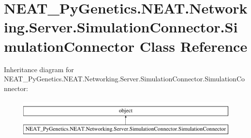 \hypertarget{classNEAT__PyGenetics_1_1NEAT_1_1Networking_1_1Server_1_1SimulationConnector_1_1SimulationConnector}{}\section{N\+E\+A\+T\+\_\+\+Py\+Genetics.\+N\+E\+A\+T.\+Networking.\+Server.\+Simulation\+Connector.\+Simulation\+Connector Class Reference}
\label{classNEAT__PyGenetics_1_1NEAT_1_1Networking_1_1Server_1_1SimulationConnector_1_1SimulationConnector}
Inheritance diagram for N\+E\+A\+T\+\_\+\+Py\+Genetics.\+N\+E\+A\+T.\+Networking.\+Server.\+Simulation\+Connector.\+Simulation\+Connector\+:\begin{figure}[H]
\begin{center}
\leavevmode
\includegraphics[height=2.000000cm]{classNEAT__PyGenetics_1_1NEAT_1_1Networking_1_1Server_1_1SimulationConnector_1_1SimulationConnector}
\end{center}
\end{figure}
